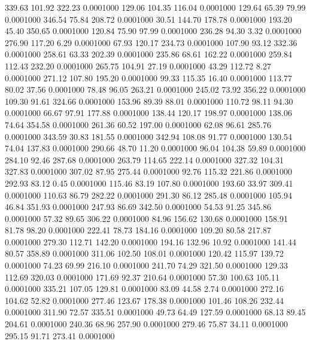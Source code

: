  339.63  101.92  322.23   0.0001000
 129.06  104.35  116.04   0.0001000
 129.64   65.39   79.99   0.0001000
 346.54   75.84  208.72   0.0001000
  30.51  144.70  178.78   0.0001000
 193.20   45.40  350.65   0.0001000
 120.84   75.90   97.99   0.0001000
 236.28   94.30    3.32   0.0001000
 276.90  117.20    6.29   0.0001000
  67.93  120.17  234.73   0.0001000
 107.90   93.12  332.36   0.0001000
 258.61   63.33  202.39   0.0001000
 235.86   68.61  162.22   0.0001000
 259.84  112.43  232.20   0.0001000
 265.75  104.91   27.19   0.0001000
  43.29  112.72    8.27   0.0001000
 271.12  107.80  195.20   0.0001000
  99.33  115.35   16.40   0.0001000
 113.77   80.02   37.56   0.0001000
  78.48   96.05  263.21   0.0001000
 245.02   73.92  356.22   0.0001000
 109.30   91.61  324.66   0.0001000
 153.96   89.39   88.01   0.0001000
 110.72   98.11   94.30   0.0001000
  66.67   97.91  177.88   0.0001000
 138.44  120.17  198.97   0.0001000
 138.06   74.64  354.58   0.0001000
 261.36   60.52  197.00   0.0001000
  62.08   96.61  285.76   0.0001000
 343.59   30.83  181.55   0.0001000
 342.94  108.08   91.77   0.0001000
 130.54   74.04  137.83   0.0001000
 290.66   48.70   11.20   0.0001000
  96.04  104.38   59.89   0.0001000
 284.10   92.46  287.68   0.0001000
 263.79  114.65  222.14   0.0001000
 327.32  104.31  327.83   0.0001000
 307.02   87.95  275.44   0.0001000
  92.76  115.32  221.86   0.0001000
 292.93   83.12    0.45   0.0001000
 115.46   83.19  107.80   0.0001000
 193.60   33.97  309.41   0.0001000
 110.63   86.79  282.22   0.0001000
 291.30   86.12  285.48   0.0001000
 105.94   46.84  351.93   0.0001000
 247.93   86.69  342.50   0.0001000
  54.53   91.25  345.86   0.0001000
  57.32   89.65  306.22   0.0001000
  84.96  156.62  130.68   0.0001000
 158.91   81.78   98.20   0.0001000
 222.41   78.73  184.16   0.0001000
 109.20   80.58  217.87   0.0001000
 279.30  112.71  142.20   0.0001000
 194.16  132.96   10.92   0.0001000
 141.44   80.57  358.89   0.0001000
 311.06  102.50  108.01   0.0001000
 120.42  115.97  139.72   0.0001000
  74.23   69.99  216.10   0.0001000
 241.70   74.29  321.50   0.0001000
 129.33  112.69  320.03   0.0001000
 171.69   92.37  210.64   0.0001000
  57.30  100.63  105.11   0.0001000
 335.21  107.05  129.81   0.0001000
  83.09   44.58    2.74   0.0001000
 272.16  104.62   52.82   0.0001000
 277.46  123.67  178.38   0.0001000
 101.46  108.26  232.44   0.0001000
 311.90   72.57  335.51   0.0001000
  49.73   64.49  127.59   0.0001000
  68.13   89.45  204.61   0.0001000
 240.36   68.96  257.90   0.0001000
 279.46   75.87   34.11   0.0001000
 295.15   91.71  273.41   0.0001000
